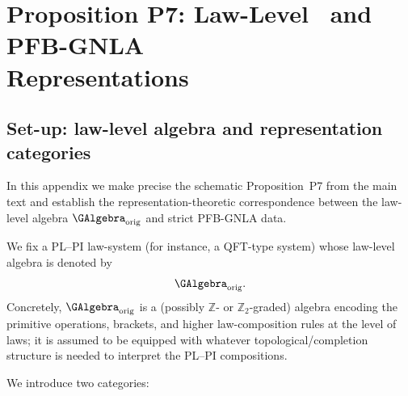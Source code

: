 \documentclass[11pt]{book}
\theoremstyle{plain}
\theoremstyle{definition}
\begin{document}
\section[Proposition P7: Law-Level G-Algebra and PFB-GNLA Representations]{Proposition P7: Law-Level \GAlgebra\ and PFB-GNLA \\ Representations}
\label{app:I-P7}

\subsection*{Set-up: law-level algebra and representation categories}


In this appendix we make precise the schematic Proposition~P7 from the
main text and establish the representation-theoretic correspondence
between the law-level algebra \(\GAlgebra_{\mathrm{orig}}\) and
strict PFB-GNLA data.

We fix a PL--PI law-system (for instance, a QFT-type system) whose
law-level algebra is denoted by
\[
  \GAlgebra_{\mathrm{orig}}.
\]
Concretely, \(\GAlgebra_{\mathrm{orig}}\) is a (possibly \(\mathbb{Z}\)- or
\(\mathbb{Z}_2\)-graded) algebra encoding the primitive operations,
brackets, and higher law-composition rules at the level of laws; it is
assumed to be equipped with whatever topological/completion structure
is needed to interpret the PL--PI compositions.

We introduce two categories:
\end{document}

